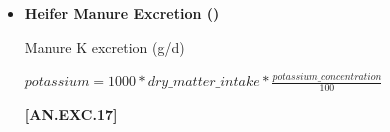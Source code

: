 \documentclass{article}
\begin{document}
\begin{refsection}
\begin{itemize}
    \begin{center}
        \(fecal\_nitrogen=(0.345+0.317 * \frac{(dry\_matter\_intake * 1000) * \frac{\frac{crude\_protein\_concentration}{6.25}}{100})}{1000}\)
    \end{center}
        \vspace{0.5cm} 
    
            {\raggedleft \textbf{[AN.EXC.15]}\par}
            \vspace{0.5cm} 

Urine N excretion (kg/d)
        \vspace{0.5cm}
    
    \begin{center}
        \(
\text{urine}_{\text{nitrogen}} = \text{manure}_{\text{nitrogen}} - \text{fecal}_{\text{nitrogen}}
\)

    \end{center}
        \vspace{0.5cm} 
    
            {\raggedleft \textbf{[AN.EXC.16]}\par}
            \vspace{0.5cm} 

Manure total ammoniacal nitrogen (kg/d) 
        \vspace{0.5cm}
    
    \begin{center}
        \(manure\_total\_ammoniacal\_nitrogen = urine\_nitrogen\)
    \end{center}
        \vspace{0.5cm} 
    
            {\raggedleft \textbf{[AN.EXC.9]}\par}
            \vspace{0.5cm} 

        \item \textbf{Heifer Manure Excretion ()}
        \vspace{0.2cm}

Manure K excretion (g/d)
        \vspace{0.5cm}
    
    \begin{center}
        \(potassium=1000 * dry\_matter\_intake * \frac{potassium\_concentration}{100}\)
    \end{center}
        \vspace{0.5cm} 
    
            {\raggedleft \textbf{[AN.EXC.17]}\par}
            \vspace{0.5cm} 


\end{itemize}
\end{refsection}
\end{document}
